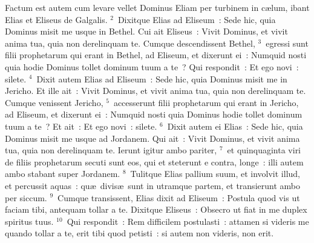 \bchapter
\lettrine[lines=3,image=true,loversize=0.05,lraise=-0.03]{F}{}actum est autem cum levare vellet Dominus Eliam per turbinem in c\ae lum, ibant Elias et Eliseus de Galgalis.
${}^{2}$~Dixitque Elias ad Eliseum~: Sede hic, quia Dominus misit me usque in Bethel. Cui ait Eliseus~: Vivit Dominus, et vivit anima tua, quia non derelinquam te. Cumque descendissent Bethel,
${}^{3}$~egressi sunt filii prophetarum qui erant in Bethel, ad Eliseum, et dixerunt ei~: Numquid nosti quia hodie Dominus tollet dominum tuum a te~? Qui respondit~: Et ego novi~: silete.
${}^{4}$~Dixit autem Elias ad Eliseum~: Sede hic, quia Dominus misit me in Jericho. Et ille ait~: Vivit Dominus, et vivit anima tua, quia non derelinquam te. Cumque venissent Jericho,
${}^{5}$~accesserunt filii prophetarum qui erant in Jericho, ad Eliseum, et dixerunt ei~: Numquid nosti quia Dominus hodie tollet dominum tuum a te~? Et ait~: Et ego novi~: silete.
${}^{6}$~Dixit autem ei Elias~: Sede hic, quia Dominus misit me usque ad Jordanem. Qui ait~: Vivit Dominus, et vivit anima tua, quia non derelinquam te. Ierunt igitur ambo pariter,
${}^{7}$~et quinquaginta viri de filiis prophetarum secuti sunt eos, qui et steterunt e contra, longe~: illi autem ambo stabant super Jordanem.
${}^{8}$~Tulitque Elias pallium suum, et involvit illud, et percussit aquas~: qu\ae\ divis\ae\ sunt in utramque partem, et transierunt ambo per siccum.
${}^{9}$~Cumque transissent, Elias dixit ad Eliseum~: Postula quod vis ut faciam tibi, antequam tollar a te. Dixitque Eliseus~: Obsecro ut fiat in me duplex spiritus tuus.
${}^{10}$~Qui respondit~: Rem difficilem postulasti~: attamen si videris me quando tollar a te, erit tibi quod petisti~: si autem non videris, non erit.


